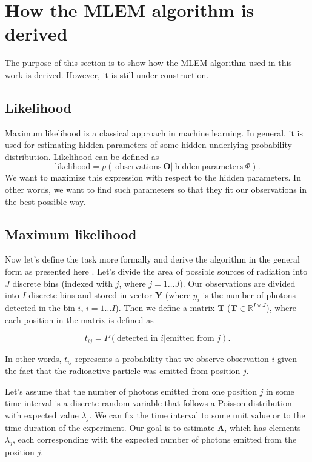 \section{How the MLEM algorithm is derived}
The purpose of this section is to show how the MLEM algorithm used in this work is derived.
However, it is still under construction.
\subsection{Likelihood}
Maximum likelihood is a classical approach in machine learning.
In general, it is used for estimating hidden parameters of some hidden underlying probability distribution.
Likelihood can be defined as 
\begin{equation}
  \mathrm{likelihood} = p(\ \mathrm{observations } \  \boldsymbol{O} | \ \mathrm{hidden \ parameters\ } \Phi ).
  \label{eq:likelihood}
\end{equation}
We want to maximize this expression with respect to the hidden parameters.
In other words, we want to find such parameters so that they fit our observations in the best possible way.

\subsection{Maximum likelihood}
Now let's define the task more formally and derive the algorithm in the general form as presented here \cite{}.
Let's divide the area of possible sources of radiation into $J$ discrete bins (indexed with $j$, where $j = 1 \dotsc J$).
Our observations are divided into $I$ discrete bins and stored in vector $\mathbf{Y}$ (where $y_{i}$ is the number of photons detected in the bin $i$, $i = 1 \dotsc I$).
Then we define a matrix $\mathbf{T}$ ($\mathbf{T} \in \mathbb{R}^{I \times J}$), where each position in the matrix is defined as

\begin{equation}
  t_{ij} =  P(\textrm{detected in } i | \textrm{emitted from } j).
\end{equation}

In other words, $t_{ij}$ represents a probability that we observe observation $i$ given the fact that the radioactive particle was emitted from position $j$.

Let's assume that the number of photons emitted from one position $j$ in some time interval is a discrete random variable that follows a Poisson distribution with expected value $\lambda_{j}$.
We can fix the time interval to some unit value or to the time duration of the experiment.
Our goal is to estimate $\mathbf{\Lambda}$, which has elements $\lambda_{j}$, each corresponding with the expected number of photons emitted from the position $j$.

